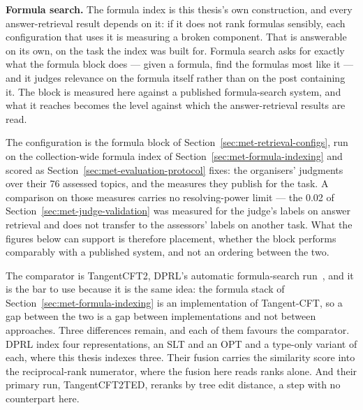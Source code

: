 \textbf{Formula search.}\label{sec:guard-task2}
The formula index is this thesis's own construction, and every answer-retrieval result depends on
it: if it does not rank formulas sensibly, each configuration that uses it is measuring a broken
component. That is answerable on its own, on the task the index was built for. Formula search asks
for exactly what the formula block does --- given a formula, find the formulas most like it ---
and it judges relevance on the formula itself rather than on the post containing it. The block is
measured here against a published formula-search system, and what it reaches becomes the level
against which the answer-retrieval results are read.

The configuration is the formula block of Section~\ref{sec:met-retrieval-configs}, run on the
collection-wide formula index of Section~\ref{sec:met-formula-indexing} and scored as
Section~\ref{sec:met-evaluation-protocol} fixes: the organisers' judgments over their 76
assessed topics, and the measures they publish for the task. A comparison on those measures
carries no resolving-power limit --- the 0.02 of Section~\ref{sec:met-judge-validation} was
measured for the judge's labels on answer retrieval and does not transfer to the assessors'
labels on another task. What the figures below can support is therefore placement, whether the
block performs comparably with a published system, and not an ordering between the two.

The comparator is TangentCFT2, DPRL's automatic formula-search run~\cite{mansouri2022dprl}, and
it is the bar to use because it is the same idea: the formula stack of
Section~\ref{sec:met-formula-indexing} is an implementation of Tangent-CFT, so a gap between
the two is a gap between implementations and not between approaches. Three differences remain,
and each of them favours the comparator. DPRL index four representations, an SLT and an OPT
and a type-only variant of each, where this thesis indexes three. Their fusion carries the
similarity score into the reciprocal-rank numerator, where the fusion here reads ranks alone.
And their primary run, TangentCFT2TED, reranks by tree edit distance, a step with no
counterpart here.

